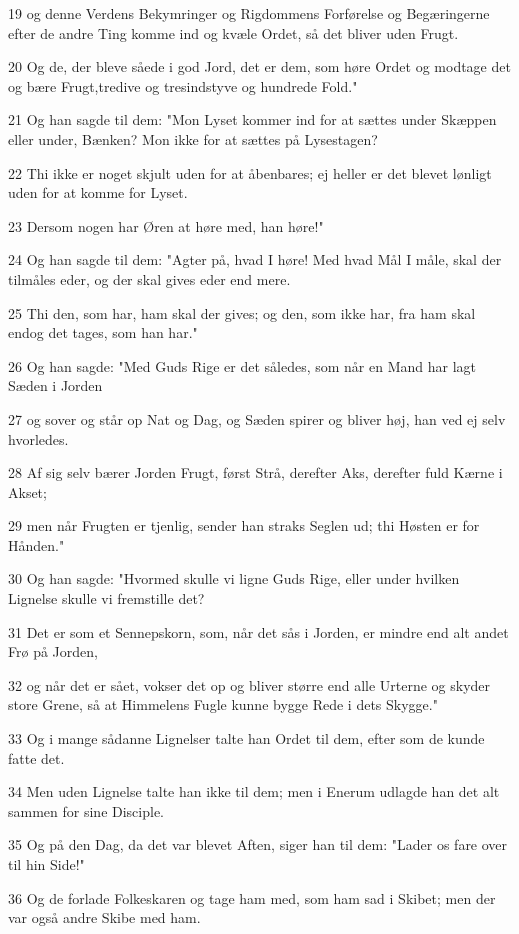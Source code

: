 \par 19 og denne Verdens Bekymringer og Rigdommens Forførelse og Begæringerne efter de andre Ting komme ind og kvæle Ordet, så det bliver uden Frugt.
\par 20 Og de, der bleve såede i god Jord, det er dem, som høre Ordet og modtage det og bære Frugt,tredive og tresindstyve og hundrede Fold."
\par 21 Og han sagde til dem: "Mon Lyset kommer ind for at sættes under Skæppen eller under, Bænken? Mon ikke for at sættes på Lysestagen?
\par 22 Thi ikke er noget skjult uden for at åbenbares; ej heller er det blevet lønligt uden for at komme for Lyset.
\par 23 Dersom nogen har Øren at høre med, han høre!"
\par 24 Og han sagde til dem: "Agter på, hvad I høre! Med hvad Mål I måle, skal der tilmåles eder, og der skal gives eder end mere.
\par 25 Thi den, som har, ham skal der gives; og den, som ikke har, fra ham skal endog det tages, som han har."
\par 26 Og han sagde: "Med Guds Rige er det således, som når en Mand har lagt Sæden i Jorden
\par 27 og sover og står op Nat og Dag, og Sæden spirer og bliver høj, han ved ej selv hvorledes.
\par 28 Af sig selv bærer Jorden Frugt, først Strå, derefter Aks, derefter fuld Kærne i Akset;
\par 29 men når Frugten er tjenlig, sender han straks Seglen ud; thi Høsten er for Hånden."
\par 30 Og han sagde: "Hvormed skulle vi ligne Guds Rige, eller under hvilken Lignelse skulle vi fremstille det?
\par 31 Det er som et Sennepskorn, som, når det sås i Jorden, er mindre end alt andet Frø på Jorden,
\par 32 og når det er sået, vokser det op og bliver større end alle Urterne og skyder store Grene, så at Himmelens Fugle kunne bygge Rede i dets Skygge."
\par 33 Og i mange sådanne Lignelser talte han Ordet til dem, efter som de kunde fatte det.
\par 34 Men uden Lignelse talte han ikke til dem; men i Enerum udlagde han det alt sammen for sine Disciple.
\par 35 Og på den Dag, da det var blevet Aften, siger han til dem: "Lader os fare over til hin Side!"
\par 36 Og de forlade Folkeskaren og tage ham med, som ham sad i Skibet; men der var også andre Skibe med ham.
